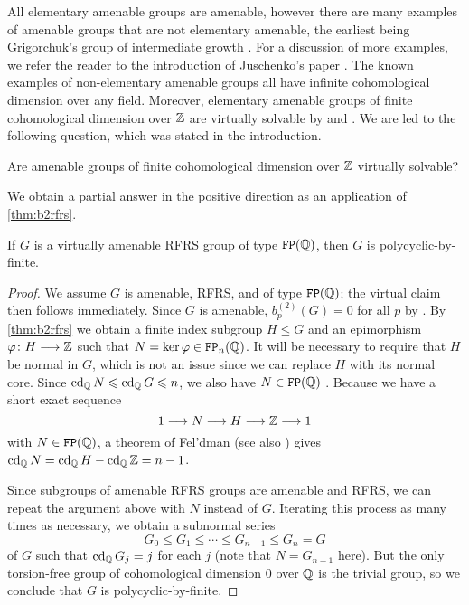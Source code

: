 \documentclass[11pt, letterpaper]{amsart}
\begin{document}
All elementary amenable groups are amenable, however there are many examples of amenable groups that are not elementary amenable, the earliest being Grigorchuk's group of intermediate growth \cite{GrigorchukGroup}. For a discussion of more examples, we refer the reader to the introduction of Juschenko's paper \cite{JuschenckoNEA}. The known examples of non-elementary amenable groups all have infinite cohomological dimension over any field.  Moreover, elementary amenable groups of finite cohomological dimension over $\mathbb{Z}$ are virtually solvable by \cite[Lemma 2]{Hillman91} and \cite[Corollary 1]{HillmanLinnell}. We are led to the following question, which was stated in the introduction. 

\begin{q}
Are amenable groups of finite cohomological dimension over $\mathbb{Z}$ virtually solvable?
\end{q}

We obtain a partial answer in the positive direction as an application of \cref{thm:b2rfrs}.

\begin{thm}\label{thm:amRFRSelemAm}
\sloppy If $G$ is a virtually amenable RFRS group of type $\mathtt{FP}(\mathbb{Q})$, then $G$ is polycyclic-by-finite.
\end{thm}
\begin{proof}
We assume $G$ is amenable, RFRS, and of type $\mathtt{FP}(\mathbb{Q})$; the virtual claim then follows immediately. Since $G$ is amenable, $b_p^{(2)}(G) = 0$ for all $p$ by \cite[Theorem 7.2(1)]{Luck02}. By \cref{thm:b2rfrs} we obtain a finite index subgroup $H \leqslant G$ and an epimorphism $\varphi \colon H \longrightarrow \mathbb{Z}$ such that $N = \ker \varphi \in \mathtt{FP}_n(\mathbb{Q})$. It will be necessary to require that $H$ be normal in $G$, which is not an issue since we can replace $H$ with its normal core. Since $\operatorname{cd}_{\mathbb{Q}} N \leqslant \operatorname{cd}_{\mathbb{Q}} G \leqslant n$, we also have $N \in \mathtt{FP}(\mathbb{Q})$ \cite[VIII Proposition 6.1]{BrownGroupCohomology}. Because we have a short exact sequence
\[
    1 \longrightarrow N \longrightarrow H \longrightarrow \mathbb{Z} \longrightarrow 1
\]
with $N \in \mathtt{FP}(\mathbb{Q})$, a theorem of Fel'dman \cite[Theorem 2.4]{Feldman71} (see also \cite[Proposition 2.5]{Bieri76}) gives $\operatorname{cd}_{\mathbb{Q}} N = \operatorname{cd}_{\mathbb{Q}} H - \operatorname{cd}_{\mathbb{Q}} \mathbb{Z} = n - 1$.

Since subgroups of amenable RFRS groups are amenable and RFRS, we can repeat the argument above with $N$ instead of $G$. Iterating this process as many times as necessary, we obtain a subnormal series
\[
    G_0 \leqslant G_1 \leqslant \cdots \leqslant G_{n-1} \leqslant G_n = G
\]
of $G$ such that $\operatorname{cd}_{\mathbb{Q}} G_j = j$ for each $j$ (note that $N = G_{n-1}$ here). But the only torsion-free group of cohomological dimension $0$ over $\mathbb{Q}$ is the trivial group, so we conclude that $G$ is polycyclic-by-finite.
\end{proof}
\end{document}
